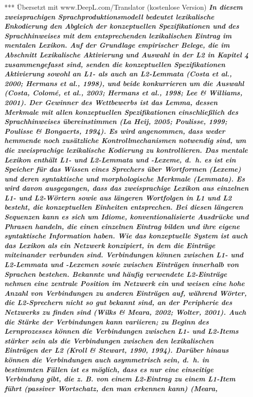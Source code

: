 \documentclass[
  letterpaper,
]{scrbook}
\begin{document}
*** Übersetzt mit www.DeepL.com/Translator (kostenlose Version)
\textbf{\emph{ In diesem zweisprachigen Sprachproduktionsmodell bedeutet
lexikalische Enkodierung den Abgleich der konzeptuellen Spezifikationen
und des Sprachhinweises mit dem entsprechenden lexikalischen Eintrag im
mentalen Lexikon. Auf der Grundlage empirischer Belege, die im Abschnitt
Lexikalische Aktivierung und Auswahl in der L2 in Kapitel 4
zusammengefasst sind, senden die konzeptuellen Spezifikationen
Aktivierung sowohl an L1- als auch an L2-Lemmata (Costa et al., 2000;
Hermans et al., 1998), und beide konkurrieren um die Auswahl (Costa,
Colomé, et al., 2003; Hermans et al., 1998; Lee \& Williams, 2001). Der
Gewinner des Wettbewerbs ist das Lemma, dessen Merkmale mit allen
konzeptuellen Spezifikationen einschließlich des Sprachhinweises
übereinstimmen (La Heij, 2005; Poulisse, 1999; Poulisse \& Bongaerts,
1994). Es wird angenommen, dass weder hemmende noch zusätzliche
Kontrollmechanismen notwendig sind, um die zweisprachige lexikalische
Kodierung zu kontrollieren. Das mentale Lexikon enthält L1- und
L2-Lemmata und -Lexeme, d.~h. es ist ein Speicher für das Wissen eines
Sprechers über Wortformen (Lexeme) und deren syntaktische und
morphologische Merkmale (Lemmata). Es wird davon ausgegangen, dass das
zweisprachige Lexikon aus einzelnen L1- und L2-Wörtern sowie aus
längeren Wortfolgen in L1 und L2 besteht, die konzeptuellen Einheiten
entsprechen. Bei diesen längeren Sequenzen kann es sich um Idiome,
konventionalisierte Ausdrücke und Phrasen handeln, die einen einzelnen
Eintrag bilden und ihre eigene syntaktische Information haben. Wie das
konzeptuelle System ist auch das Lexikon als ein Netzwerk konzipiert, in
dem die Einträge miteinander verbunden sind. Verbindungen können
zwischen L1- und L2-Lemmata und -Lexemen sowie zwischen Einträgen
innerhalb von Sprachen bestehen. Bekannte und häufig verwendete
L2-Einträge nehmen eine zentrale Position im Netzwerk ein und weisen
eine hohe Anzahl von Verbindungen zu anderen Einträgen auf, während
Wörter, die L2-Sprechern nicht so gut bekannt sind, an der Peripherie
des Netzwerks zu finden sind (Wilks \& Meara, 2002; Wolter, 2001). Auch
die Stärke der Verbindungen kann variieren; zu Beginn des Lernprozesses
können die Verbindungen zwischen L1- und L2-Items stärker sein als die
Verbindungen zwischen den lexikalischen Einträgen der L2 (Kroll \&
Stewart, 1990, 1994). Darüber hinaus können die Verbindungen auch
asymmetrisch sein, d.~h. in bestimmten Fällen ist es möglich, dass es
nur eine einseitige Verbindung gibt, die z. B. von einem L2-Eintrag zu
einem L1-Item führt (passiver Wortschatz, den man erkennen kann) (Meara,
}}
\end{document}
